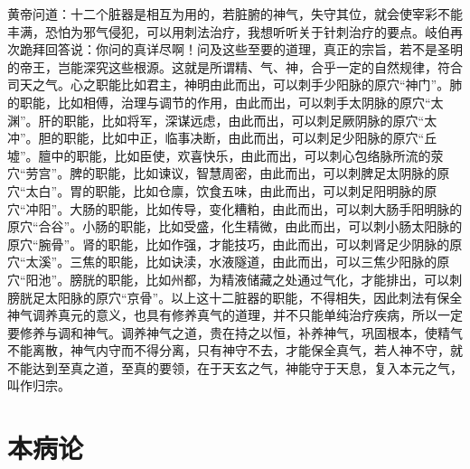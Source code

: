 \documentclass[a4paper,12pt,UTF8,twoside]{ctexbook}
\begin{document}
黄帝问道：十二个脏器是相互为用的，若脏腑的神气，失守其位，就会使宰彩不能丰满，恐怕为邪气侵犯，可以用刺法治疗，我想听听关于针刺治疗的要点。岐伯再次跪拜回答说：你问的真详尽啊！问及这些至要的道理，真正的宗旨，若不是圣明的帝王，岂能深究这些根源。这就是所谓精、气、神，合乎一定的自然规律，符合司天之气。心之职能比如君主，神明由此而出，可以刺手少阳脉的原穴“神门”。肺的职能，比如相傅，治理与调节的作用，由此而出，可以刺手太阴脉的原穴“太渊”。肝的职能，比如将军，深谋远虑，由此而出，可以刺足厥阴脉的原穴“太冲”。胆的职能，比如中正，临事决断，由此而出，可以刺足少阳脉的原穴“丘墟”。膻中的职能，比如臣使，欢喜快乐，由此而出，可以刺心包络脉所流的荥穴“劳宫”。脾的职能，比如谏议，智慧周密，由此而出，可以刺脾足太阴脉的原穴“太白”。胃的职能，比如仓廪，饮食五味，由此而出，可以刺足阳明脉的原穴“冲阳”。大肠的职能，比如传导，变化糟粕，由此而出，可以刺大肠手阳明脉的原穴“合谷”。小肠的职能，比如受盛，化生精微，由此而出，可以刺小肠太阳脉的原穴“腕骨”。肾的职能，比如作强，才能技巧，由此而出，可以刺肾足少阴脉的原穴“太溪”。三焦的职能，比如诀渎，水液隧道，由此而出，可以三焦少阳脉的原穴“阳池”。膀胱的职能，比如州都，为精液储藏之处通过气化，才能排出，可以刺膀胱足太阳脉的原穴“京骨”。以上这十二脏器的职能，不得相失，因此刺法有保全神气调养真元的意义，也具有修养真气的道理，并不只能单纯治疗疾病，所以一定要修养与调和神气。调养神气之道，贵在持之以恒，补养神气，巩固根本，使精气不能离散，神气内守而不得分离，只有神守不去，才能保全真气，若人神不守，就不能达到至真之道，至真的要领，在于天玄之气，神能守于天息，复入本元之气，叫作归宗。

\chapter{本病论}
\end{document}
